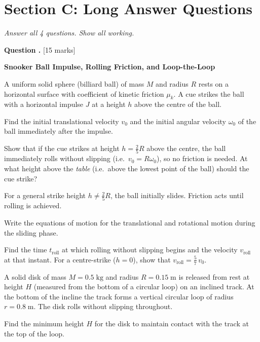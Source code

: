 \documentclass[12pt,a4paper]{article}
\newcounter{questioncounter}
\newcommand{\question}[1]{%
  \stepcounter{questioncounter}%
  \vspace{0.5cm}%
  \noindent\textbf{Question \thequestioncounter.} \hfill [#1 marks]%
  \vspace{0.2cm}%
  \par%
}
\begin{document}
\newpage

\section*{Section C: Long Answer Questions}
\noindent\textit{Answer all 4 questions. Show all working.}

\setcounter{questioncounter}{0}

\question{15}

\noindent\textbf{Snooker Ball Impulse, Rolling Friction, and Loop-the-Loop}

\begin{parts}
\item A uniform solid sphere (billiard ball) of mass $M$ and radius $R$ rests on a horizontal surface with coefficient of kinetic friction $\mu_k$. A cue strikes the ball with a horizontal impulse $J$ at a height $h$ above the centre of the ball.
\begin{parts}
\item Find the initial translational velocity $v_0$ and the initial angular velocity $\omega_0$ of the ball immediately after the impulse. 
\item Show that if the cue strikes at height $h = \frac{2}{5}R$ above the centre, the ball immediately rolls without slipping (i.e.\ $v_0 = R\omega_0$), so no friction is needed. At what height above the \emph{table} (i.e.\ above the lowest point of the ball) should the cue strike? 
\end{parts}

\item For a general strike height $h \neq \frac{2}{5}R$, the ball initially slides. Friction acts until rolling is achieved.
\begin{parts}
\item Write the equations of motion for the translational and rotational motion during the sliding phase. 
\item Find the time $t_\text{roll}$ at which rolling without slipping begins and the velocity $v_\text{roll}$ at that instant. For a centre-strike ($h = 0$), show that $v_\text{roll} = \frac{5}{7}\,v_0$. 
\end{parts}

\item A solid disk of mass $M = 0.5\;\text{kg}$ and radius $R = 0.15\;\text{m}$ is released from rest at height $H$ (measured from the bottom of a circular loop) on an inclined track. At the bottom of the incline the track forms a vertical circular loop of radius $r = 0.8\;\text{m}$. The disk rolls without slipping throughout.

Find the minimum height $H$ for the disk to maintain contact with the track at the top of the loop. 
\end{parts}
\end{document}
